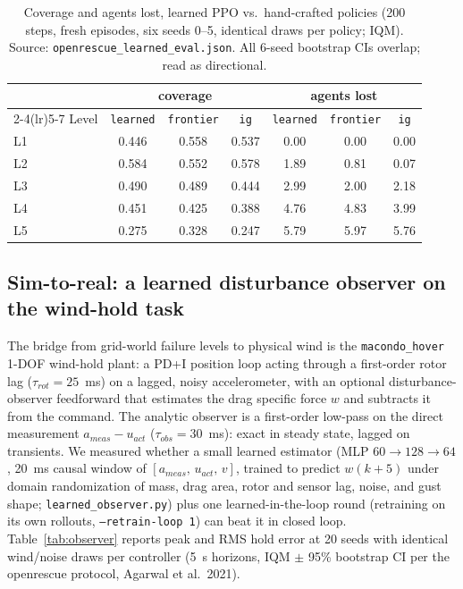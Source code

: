 \documentclass[12pt,a4paper]{article}
\begin{document}
\begin{table}[h]
\centering
\caption{Coverage and agents lost, learned PPO vs.~hand-crafted policies
(200 steps, fresh episodes, six seeds 0--5, identical draws per policy; IQM).
Source: \texttt{openrescue\_learned\_eval.json}. All 6-seed bootstrap CIs
overlap; read as directional.}
\label{tab:learned}
\small
\begin{tabular}{lcccccc}
\toprule
 & \multicolumn{3}{c}{coverage} & \multicolumn{3}{c}{agents lost} \\
\cmidrule(lr){2-4}\cmidrule(lr){5-7}
Level & \texttt{learned} & \texttt{frontier} & \texttt{ig} & \texttt{learned} & \texttt{frontier} & \texttt{ig} \\
\midrule
L1 & 0.446 & 0.558 & 0.537 & 0.00 & 0.00 & 0.00 \\
L2 & 0.584 & 0.552 & 0.578 & 1.89 & 0.81 & 0.07 \\
L3 & 0.490 & 0.489 & 0.444 & 2.99 & 2.00 & 2.18 \\
L4 & 0.451 & 0.425 & 0.388 & 4.76 & 4.83 & 3.99 \\
L5 & 0.275 & 0.328 & 0.247 & 5.79 & 5.97 & 5.76 \\
\bottomrule
\end{tabular}
\end{table}

\subsection{Sim-to-real: a learned disturbance observer on the wind-hold task}
\label{sec:observer}

The bridge from grid-world failure levels to physical wind is the
\texttt{macondo\_hover} 1-DOF wind-hold plant: a PD+I position loop acting
through a first-order rotor lag ($\tau_{rot}=25$~ms) on a lagged, noisy
accelerometer, with an optional disturbance-observer feedforward that
estimates the drag specific force $w$ and subtracts it from the command. The
analytic observer is a first-order low-pass on the direct measurement
$a_{meas}-u_{act}$ ($\tau_{obs}=30$~ms): exact in steady state, lagged on
transients. We measured whether a small learned estimator (MLP
$60{\to}128{\to}64$, 20~ms causal window of $[a_{meas},\,u_{act},\,v]$,
trained to predict $w(k{+}5)$ under domain randomization of mass, drag area,
rotor and sensor lag, noise, and gust shape; \texttt{learned\_observer.py})
plus one learned-in-the-loop round (retraining on its own rollouts,
\texttt{--retrain-loop 1}) can beat it in closed loop. Table~\ref{tab:observer} reports peak and RMS
hold error at 20 seeds with identical wind/noise draws per controller
(5~s horizons, IQM $\pm$ 95\% bootstrap CI per the openrescue protocol,
Agarwal et al.~2021).
\end{document}

